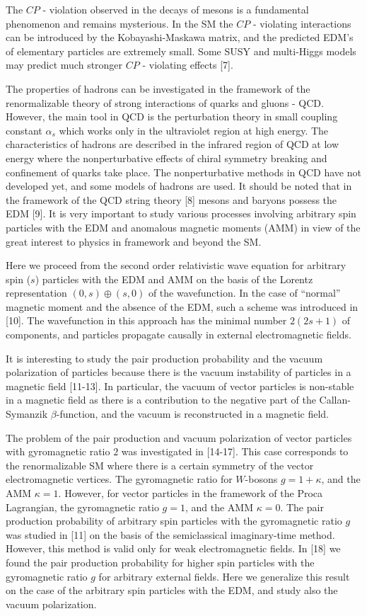 \documentclass[a4paper,12pt]{article}
\begin{document}
The $CP$ - violation observed in the decays of mesons is a fundamental
phenomenon and remains mysterious. In the SM the $CP$ - violating
interactions can be introduced by the Kobayashi-Maskawa matrix, and the
predicted EDM's of elementary particles are extremely small. Some SUSY and
multi-Higgs models may predict much stronger $CP$ - violating effects [7].

The properties of hadrons can be investigated in the framework of the
renormalizable theory of strong interactions of quarks and gluons - QCD.
However, the main tool in QCD is the perturbation theory in small coupling
constant $\alpha _s$ which works only in the ultraviolet region at high
energy. The characteristics of hadrons are described in the infrared region
of QCD at low energy where the nonperturbative effects of chiral symmetry
breaking and confinement of quarks take place. The nonperturbative methods
in QCD have not developed yet, and some models of hadrons are used. It
should be noted that in the framework of the QCD string theory [8] mesons
and baryons possess the EDM [9]. It is very important to study various
processes involving arbitrary spin particles with the EDM and anomalous
magnetic moments (AMM) in view of the great interest to physics in framework
and beyond the SM.

Here we proceed from the second order relativistic wave equation for
arbitrary spin ($s$) particles with the EDM and AMM on the basis of the
Lorentz representation $(0,s)\oplus (s,0)$ of the wavefunction. In the case
of ``normal'' magnetic moment and the absence of the EDM, such a scheme was
introduced in [10]. The wavefunction in this approach has the minimal number
$2(2s+1)$ of components, and particles propagate causally in external
electromagnetic fields.

It is interesting to study the pair production probability and the vacuum
polarization of particles because there is the vacuum instability of
particles in a magnetic field [11-13]. In particular, the vacuum of vector
particles is non-stable in a magnetic field as there is a contribution to
the negative part of the Callan-Symanzik $\beta $-function, and the vacuum
is reconstructed in a magnetic field.

The problem of the pair production and vacuum polarization of
vector particles with gyromagnetic ratio $2$ was investigated in
[14-17]. This case corresponds to the renormalizable SM where
there is a certain symmetry of the vector electromagnetic
vertices. The gyromagnetic ratio for $W$-bosons $ g=1+\kappa $,
and the AMM $\kappa =1$. However, for vector particles in the
framework of the Proca Lagrangian, the gyromagnetic ratio $g=1$,
and the AMM $\kappa =0$. The pair production probability of
arbitrary spin particles with the gyromagnetic ratio $g$ was
studied in [11] on the basis of the semiclassical imaginary-time
method. However, this method is valid only for weak
electromagnetic fields. In [18] we found the pair production
probability for higher spin particles with the gyromagnetic ratio
$g$ for arbitrary external fields. Here we generalize this result
on the case of the arbitrary spin particles with the EDM, and
study also the vacuum polarization.
\end{document}
